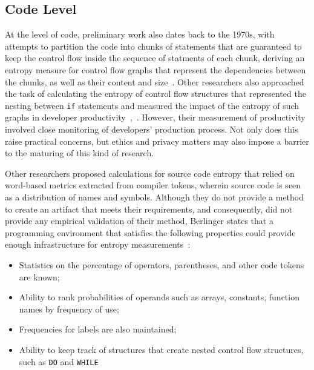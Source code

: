 \documentclass[10pt,conference]{IEEEtran}
\begin{document}
\subsection{Code Level} \label{code_level}
At the level of code, preliminary work also dates back to the 1970s, with attempts to partition the code into chunks of statements that are guaranteed to keep the control flow inside the sequence of statments of each chunk, deriving an entropy measure for control flow graphs that represent the dependencies between the chunks, as well as their content and size~\cite{davi88complexity}. Other researchers also approached the task of calculating the entropy of control flow structures that represented the nesting between \texttt{if} statements and measured the impact of the entropy of such graphs in developer productivity~\cite{chen1978complexity},~\cite{khoshgoftaar1998information}. However, their measurement of productivity involved close monitoring of developers' production process. Not only does this raise practical concerns, but ethics and privacy matters may also impose a barrier to the maturing of this kind of research.

Other researchers proposed calculations for source code entropy that relied on word-based metrics extracted from compiler tokens, wherein source code is seen as a distribution of names and symbols. Although they do not provide a method to create an artifact that meets their requirements, and consequently, did not provide any empirical validation of their method, Berlinger states that a programming environment that satisfies the following properties could provide enough infrastructure for entropy measurements~\cite{berlinger1980complexity}:
\begin{itemize}
    \item Statistics on the percentage of operators, parentheses, and other code tokens are known;
    \item Ability to rank probabilities of operands such as arrays, constants, function names by frequency of use;
    \item Frequencies for labels are also maintained;
    \item Ability to keep track of structures that create nested control flow structures, such as \texttt{DO} and \texttt{WHILE}
\end{itemize}
\end{document}
